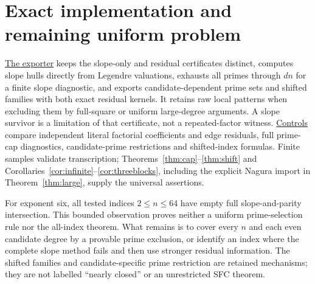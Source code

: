 \documentclass[11pt]{article}
\begin{document}
\section{Exact implementation and remaining uniform problem}
\href{newton_slope_coverage.py}{The exporter} keeps the slope-only
and residual certificates distinct, computes slope hulls directly from
Legendre valuations, exhausts all primes through $dn$ for a finite
slope diagnostic, and exports candidate-dependent prime sets and shifted
families with both exact residual kernels. It retains raw local patterns
when excluding them by full-square or uniform large-degree arguments. A slope survivor is a
limitation of that certificate, not a repeated-factor witness.
\href{verify_slope_coverage.py}{Controls} compare independent literal
factorial coefficients and edge residuals, full prime-cap diagnostics,
candidate-prime restrictions and shifted-index formulas. Finite samples
validate transcription; Theorems~\ref{thm:cap}--\ref{thm:shift} and
Corollaries~\ref{cor:infinite}--\ref{cor:threeblocks}, including the
explicit Nagura import in Theorem~\ref{thm:large}, supply the universal assertions.

For exponent six, all tested indices $2\le n\le64$ have empty full
slope-and-parity intersection. This bounded observation proves neither
a uniform prime-selection rule nor the all-index theorem. What remains
is to cover every $n$ and each even candidate degree by a provable
prime exclusion, or identify an index where the complete slope method
fails and then use stronger residual information. The shifted families
and candidate-specific prime restriction are retained mechanisms;
they are not labelled ``nearly closed'' or an unrestricted SFC theorem.
\end{document}
